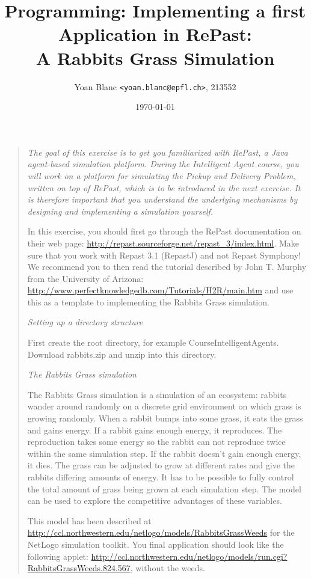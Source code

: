 \documentclass[10pt,a4paper]{article}
\title{\phantomsection%
    Programming: Implementing a first Application in RePast:\\
    A Rabbits Grass Simulation
}
\author{
    Yoan Blanc \texttt{<yoan.blanc@epfl.ch>}, 213552\\
}
\date{\today}
\begin{document}
\maketitle

\noindent
\begin{quote}{\it
    The goal of this exercise is to get you familiarized with \emph{RePast}, a Java
    agent-based simulation platform. During the Intelligent Agent course, you
    will work on a platform for simulating the Pickup and Delivery Problem,
    written on top of RePast, which is to be introduced in the next exercise.
    It is therefore important that you understand the underlying mechanisms by
    designing and implementing a simulation yourself.

    In this exercise, you should first go through the RePast documentation on
    their web page: \url{http://repast.sourceforge.net/repast_3/index.html}. Make
    sure that you work with Repast 3.1 (RepastJ) and not Repast Symphony! We
    recommend you to then read the tutorial described by John T. Murphy from
    the University of Arizona:
    \url{http://www.perfectknowledgedb.com/Tutorials/H2R/main.htm} and use this as a
    template to implementing the Rabbits Grass simulation.

    \emph{Setting up a directory structure}

    First create the root directory, for example CourseIntelligentAgents.
    Download rabbits.zip and unzip into this directory.

    \emph{The Rabbits Grass simulation}

    The Rabbits Grass simulation is a simulation of an ecosystem: rabbits
    wander around randomly on a discrete grid environment on which grass is
    growing randomly. When a rabbit bumps into some grass, it eats the grass
    and gains energy. If a rabbit gains enough energy, it reproduces. The
    reproduction takes some energy so the rabbit can not reproduce twice within
    the same simulation step. If the rabbit doesn't gain enough energy, it
    dies. The grass can be adjusted to grow at different rates and give the
    rabbits differing amounts of energy. It has to be possible to fully control
    the total amount of grass being grown at each simulation step. The model
    can be used to explore the competitive advantages of these variables.

    This model has been described at
    \url{http://ccl.northwestern.edu/netlogo/models/RabbitsGrassWeeds} for the
    NetLogo simulation toolkit. You final application should look like the
    following applet:
    \url{http://ccl.northwestern.edu/netlogo/models/run.cgi?RabbitsGrassWeeds.824.567},
    without the weeds.

}
\end{quote}
\end{document}
